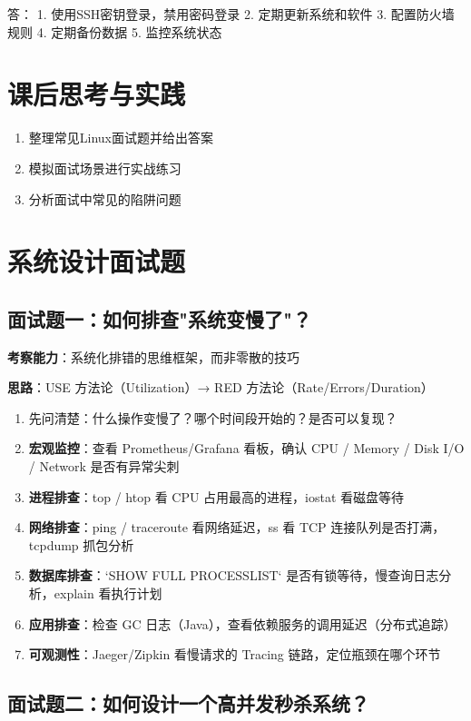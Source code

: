 \documentclass[12pt,UTF8]{ctexbook}
\begin{document}
答：
1. 使用SSH密钥登录，禁用密码登录
2. 定期更新系统和软件
3. 配置防火墙规则
4. 定期备份数据
5. 监控系统状态

\section{课后思考与实践}
\label{sec:interview-practice}
\begin{enumerate}
    \item 整理常见Linux面试题并给出答案
    \item 模拟面试场景进行实战练习
    \item 分析面试中常见的陷阱问题
\end{enumerate}

\section{系统设计面试题}
\label{sec:interview-system-design}

\subsection*{面试题一：如何排查"系统变慢了"？}

\textbf{考察能力}：系统化排错的思维框架，而非零散的技巧

\textbf{思路}：USE 方法论（Utilization）→ RED 方法论（Rate/Errors/Duration）

\begin{enumerate}
    \item 先问清楚：什么操作变慢了？哪个时间段开始的？是否可以复现？
    \item \textbf{宏观监控}：查看 Prometheus/Grafana 看板，确认 CPU / Memory / Disk I/O / Network 是否有异常尖刺
    \item \textbf{进程排查}：top / htop 看 CPU 占用最高的进程，iostat 看磁盘等待
    \item \textbf{网络排查}：ping / traceroute 看网络延迟，ss 看 TCP 连接队列是否打满，tcpdump 抓包分析
    \item \textbf{数据库排查}：`SHOW FULL PROCESSLIST` 是否有锁等待，慢查询日志分析，explain 看执行计划
    \item \textbf{应用排查}：检查 GC 日志（Java），查看依赖服务的调用延迟（分布式追踪）
    \item \textbf{可观测性}：Jaeger/Zipkin 看慢请求的 Tracing 链路，定位瓶颈在哪个环节
\end{enumerate}

\subsection*{面试题二：如何设计一个高并发秒杀系统？}
\end{document}
